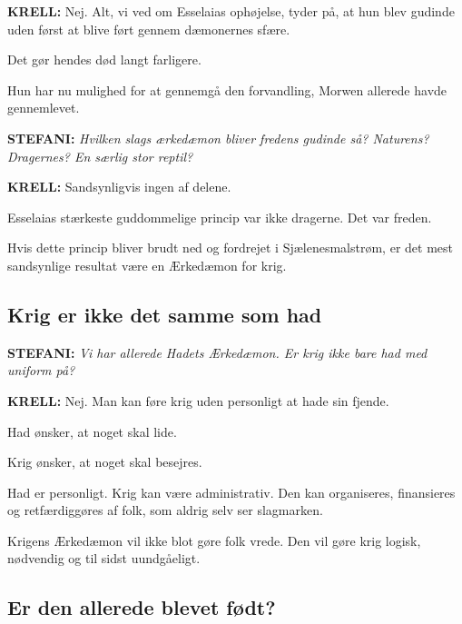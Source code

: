 \documentclass[a4paper,12pt]{memoir}
\begin{document}
\par\smallskip

\noindent
{\sffamily\bfseries KRELL:}
Nej. Alt, vi ved om Esselaias ophøjelse, tyder på, at hun
blev gudinde uden først at blive ført gennem dæmonernes
sfære.

Det gør hendes død langt farligere.

Hun har nu mulighed for at gennemgå den forvandling, Morwen
allerede havde gennemlevet.

\par\medskip

\noindent
{\sffamily\bfseries\color{Maroon!90!black} STEFANI:}
\textit{Hvilken slags ærkedæmon bliver fredens gudinde så?
Naturens? Dragernes? En særlig stor reptil?}

\par\smallskip

\noindent
{\sffamily\bfseries KRELL:}
Sandsynligvis ingen af delene.

Esselaias stærkeste guddommelige princip var ikke dragerne. Det var freden.

Hvis dette princip bliver brudt ned og fordrejet i Sjælenesmalstrøm, er det mest sandsynlige resultat være en Ærkedæmon for krig.

\subsection*{Krig er ikke det samme som had}

\noindent
{\sffamily\bfseries\color{Maroon!90!black} STEFANI:}
\textit{Vi har allerede Hadets Ærkedæmon. Er krig ikke
bare had med uniform på?}

\par\smallskip

\noindent
{\sffamily\bfseries KRELL:}
Nej. Man kan føre krig uden personligt at hade sin fjende.

Had ønsker, at noget skal lide.

Krig ønsker, at noget skal besejres.

Had er personligt. Krig kan være administrativ. Den kan
organiseres, finansieres og retfærdiggøres af folk, som aldrig
selv ser slagmarken.

Krigens Ærkedæmon vil ikke blot gøre folk vrede. Den vil
gøre krig logisk, nødvendig og til sidst uundgåeligt.

\subsection*{Er den allerede blevet født?}
\end{document}
